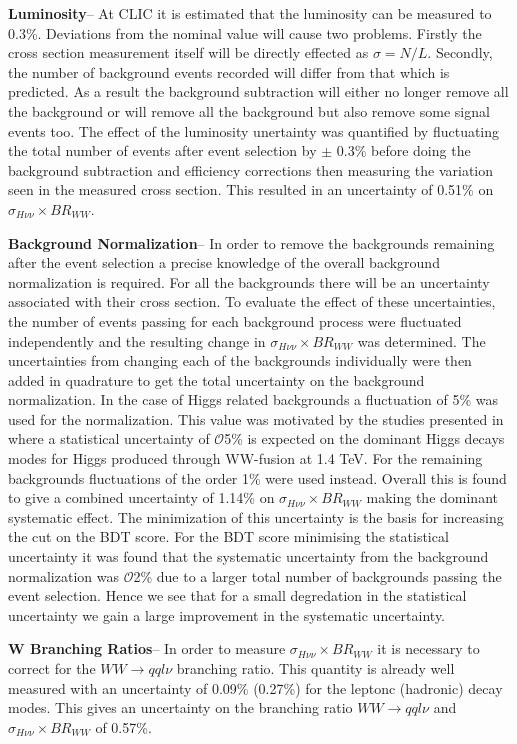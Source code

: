 \textbf{Luminosity}-- At \ac{CLIC} it is estimated that the luminosity can be measured to 0.3\%. Deviations from the nominal value will cause two problems. Firstly the cross section measurement itself will be directly effected as $\sigma=N/L$. Secondly, the number of background events recorded will differ from that which is predicted. As a result the background subtraction will either no longer remove all the background or will remove all the background but also remove some signal events too. The effect of the luminosity unertainty was quantified by fluctuating the total number of events after event selection by $\pm$ 0.3\% before doing the background subtraction and efficiency corrections then measuring the variation seen in the measured cross section. This resulted in an uncertainty of 0.51\% on $\sigma_{H\nu\nu}\times BR_{WW}$.

\textbf{Background Normalization}-- In order to remove the backgrounds remaining after the event selection a precise knowledge of the overall background normalization is required. For all the backgrounds there will be an uncertainty associated with their cross section. To evaluate the effect of these uncertainties, the number of events passing for each background process were fluctuated independently and the resulting change in $\sigma_{H\nu\nu}\times BR_{WW}$ was determined. The uncertainties from changing each of the backgrounds individually were then added in quadrature to get the total uncertainty on the background normalization. In the case of Higgs related backgrounds a fluctuation of 5\% was used for the normalization. This value was motivated by the studies presented in  \cite{Abramowicz:2016zbo} where a statistical uncertainty of $\mathcal{O}$5\% is expected on the dominant Higgs decays modes for Higgs produced through WW-fusion at 1.4 TeV. For the remaining backgrounds fluctuations of the order 1\% were used instead. Overall this is found to give a combined uncertainty of 1.14\% on $\sigma_{H\nu\nu}\times BR_{WW}$ making the dominant systematic effect. The minimization of this uncertainty is the basis for increasing the cut on the BDT score. For the BDT score minimising the statistical uncertainty it was found that the systematic uncertainty from the background normalization was $\mathcal{O}$2\% due to a larger total number of backgrounds passing the event selection. Hence we see that for a small degredation in the statistical uncertainty we gain a large improvement in the systematic  uncertainty.

\textbf{W Branching Ratios}-- In order to measure $\sigma_{H\nu\nu}\times BR_{WW}$ it is necessary to correct for the $WW\rightarrow qql\nu$ branching ratio. This quantity is already well measured with an uncertainty of 0.09\% (0.27\%) for the leptonc (hadronic) decay modes. This gives an uncertainty on the branching ratio $WW\rightarrow qql\nu$ and $\sigma_{H\nu\nu}\times BR_{WW}$ of 0.57\%.

